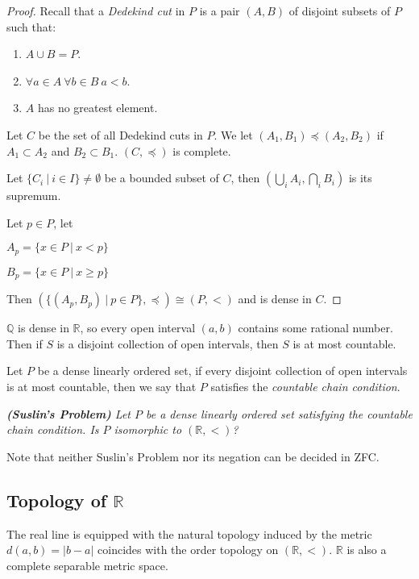 \documentclass[8pt]{article}
\theoremstyle{definition}
\theoremstyle{definition}
\theoremstyle{definition}
\theoremstyle{definition}
\theoremstyle{definition}
\theoremstyle{definition}
\theoremstyle{definition}
\theoremstyle{definition}
\theoremstyle{definition}
\theoremstyle{definition}
\theoremstyle{definition}
\theoremstyle{definition}
\theoremstyle{definition}
\theoremstyle{definition}
\theoremstyle{question}
\begin{document}
\begin{proof}
  Recall that a \emph{Dedekind cut} in $P$ is a pair $(A, B)$ of disjoint subsets of $P$ such that:
  \begin{enumerate}
    \item $A \cup B = P$.
    \item $\forall a \in A \: \forall b \in B \: a < b$.
    \item $A$ has no greatest element.
  \end{enumerate}

  Let $C$ be the set of all Dedekind cuts in $P$. We let $(A_1, B_1) \preceq (A_2, B_2)$
  if $A_1 \subset A_2$ and $B_2 \subset B_1$. $(C, \preceq)$ is complete.

  Let $\{ C_i \: | \: i \in I \} \neq \emptyset$ be a bounded subset of $C$, then 
  $(\bigcup \limits_i A_i, \bigcap \limits_i B_i)$ is its supremum.

  Let $p \in P$, let
  \begin{center}
    $A_p = \{ x \in P \: | \: x < p \}$

    $B_p = \{ x \in P \: | \: x \geq p \}$
  \end{center}

  Then $(\{ (A_p, B_p) \: | \: p \in P \}, \preceq) \cong (P, <)$ and is dense in $C$.
\end{proof}

$\mathbb{Q}$ is dense in $\mathbb{R}$, so every open interval $(a, b)$ contains some rational number.
Then if $S$ is a disjoint collection of open intervals, then $S$ is at most countable.

Let $P$ be a dense linearly ordered set, if every disjoint collection of open intervals is at most countable, then we say
that $P$ satisfies the \emph{countable chain condition}.

\emph{{\bf (Suslin's Problem)} Let $P$ be a dense linearly ordered set satisfying the countable chain condition. Is $P$ isomorphic to $(\mathbb{R}, <)$?}

Note that neither Suslin's Problem nor its negation can be decided in ZFC.

\subsection{Topology of $\mathbb{R}$}

The real line is equipped with the natural topology induced by the metric $d(a, b) = |b - a|$ coincides with
the order topology on $(\mathbb{R}, <)$. $\mathbb{R}$ is also a complete separable metric space.
\end{document}
